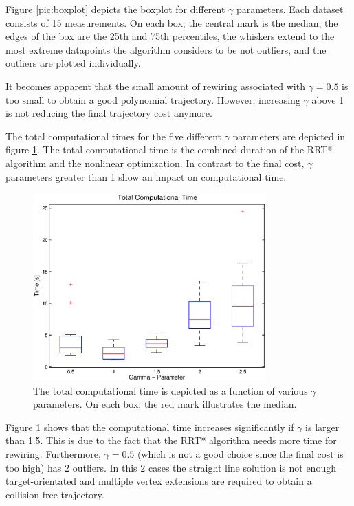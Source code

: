 Figure \ref{pic:boxplot} depicts the boxplot for different $\gamma$ parameters. Each dataset consists of 15 measurements. On each box, the central mark is the median, the edges of the box are the 25th and 75th percentiles, the whiskers extend to the most extreme
datapoints the algorithm considers to be not outliers, and the outliers are plotted individually. \newline

It becomes apparent that the small amount of rewiring associated with $\gamma = 0.5$ is too small to obtain a good polynomial trajectory. However, increasing $\gamma$ above 1 is not reducing the final trajectory cost anymore. \newline

The total computational times for the five different $\gamma$ parameters are depicted in figure \ref{pic:boxplot_time}. The total computational time is the combined duration of the RRT* algorithm and the nonlinear optimization. In contrast to the final cost, $\gamma$ parameters greater than 1 show an impact on computational time.

\begin{figure}[h]
   \centering
   \includegraphics[trim = 14mm 10mm 15mm 0mm,clip,width=0.8\textwidth]{pics/boxplot_time.eps}
   \caption{The total computational time is depicted as a function of various $\gamma$ parameters. On each box, the red mark illustrates the median.}
   \label{pic:boxplot_time}
\end{figure}

Figure \ref{pic:boxplot_time} shows that the computational time increases significantly if $\gamma$ is larger than 1.5. This is due to the fact that the RRT* algorithm needs more time for rewiring. Furthermore, $\gamma = 0.5$ (which is not a good choice since the final cost is too high) has 2 outliers. In this 2 cases the straight line solution is not enough target-orientated and multiple vertex extensions are required to obtain a collision-free trajectory. \newline


